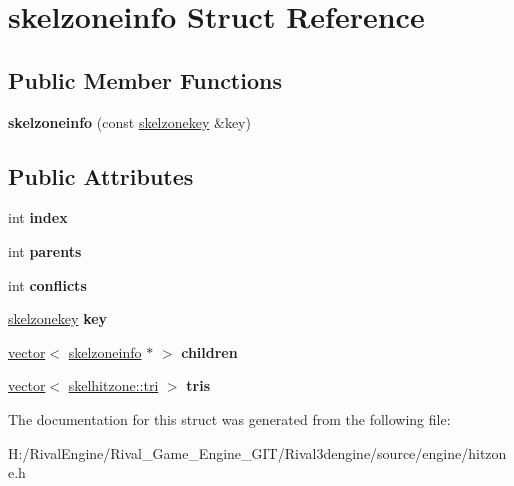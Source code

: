 \hypertarget{structskelzoneinfo}{}\section{skelzoneinfo Struct Reference}
\label{structskelzoneinfo}
\subsection*{Public Member Functions}
\begin{DoxyCompactItemize}
\item 
\mbox{\label{structskelzoneinfo_ac88b3bd5db1126da61fcbc492cdcae97}} 
{\bfseries skelzoneinfo} (const \hyperlink{structskelzonekey}{skelzonekey} \&key)
\end{DoxyCompactItemize}
\subsection*{Public Attributes}
\begin{DoxyCompactItemize}
\item 
\mbox{\label{structskelzoneinfo_a33830772221c1c131042c71523f880ce}} 
int {\bfseries index}
\item 
\mbox{\label{structskelzoneinfo_aebbdaba8d959148270110d7e9c0d2e88}} 
int {\bfseries parents}
\item 
\mbox{\label{structskelzoneinfo_a47df7ed50ed3baa3c67485ac898b98ce}} 
int {\bfseries conflicts}
\item 
\mbox{\label{structskelzoneinfo_ac172de980d34ef3b6cc08c323072ff3b}} 
\hyperlink{structskelzonekey}{skelzonekey} {\bfseries key}
\item 
\mbox{\label{structskelzoneinfo_ac23e81eb2c830d36ca002b055d830a6e}} 
\hyperlink{structvector}{vector}$<$ \hyperlink{structskelzoneinfo}{skelzoneinfo} $\ast$ $>$ {\bfseries children}
\item 
\mbox{\label{structskelzoneinfo_ab721ba3257e5644401191a092b581a1f}} 
\hyperlink{structvector}{vector}$<$ \hyperlink{structskelbih_1_1tri}{skelhitzone\+::tri} $>$ {\bfseries tris}
\end{DoxyCompactItemize}


The documentation for this struct was generated from the following file\+:\begin{DoxyCompactItemize}
\item 
H\+:/\+Rival\+Engine/\+Rival\+\_\+\+Game\+\_\+\+Engine\+\_\+\+G\+I\+T/\+Rival3dengine/source/engine/hitzone.\+h\end{DoxyCompactItemize}
